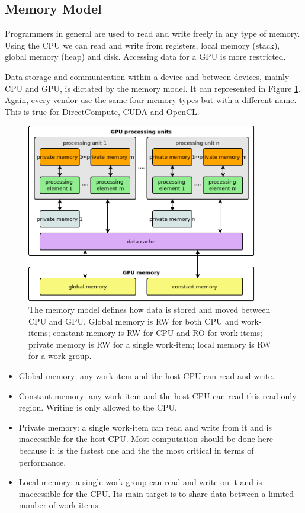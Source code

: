 \documentclass{article}
\begin{document}
\subsection{Memory Model}

Programmers in general are used to read and write freely in any type of memory. Using the CPU we can read and write from registers, local memory (stack), global memory (heap) and disk. Accessing data for a GPU is more restricted.

Data storage and communication within a device and between devices, mainly CPU and GPU, is dictated by the memory model. It can represented in Figure \ref{figure:memory}. Again, every vendor use the same four memory types but with a different name. This is true for DirectCompute, CUDA and OpenCL.

\begin{figure}[!ht]
\centering
\includegraphics[width=0.9\textwidth]{memory}
\caption{The memory model defines how data is stored and moved between CPU and GPU. Global memory is RW for both CPU and work-items; constant memory is RW for CPU and RO for work-items; private memory is RW for a single work-item; local memory is RW for a work-group.}
\label{figure:memory}
\end{figure}

\begin{itemize}
\item Global memory: any work-item and the host CPU can read and write.
\item Constant memory: any work-item and the host CPU can read this read-only region. Writing is only allowed to the CPU.
\item Private memory: a single work-item can read and write from it and is inaccessible for the host CPU. Most computation should be done here because it is the fastest one and the the most critical in terms of performance.
\item Local memory: a single work-group can read and write on it and is inaccessible for the CPU. Its main target is to share data between a limited number of work-items.
\end{itemize}
\end{document}
